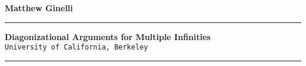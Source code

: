 \documentclass[a4paper,12pt]{article}
\newcommand{\titleline}[1]{\noindent\rule{\textwidth}{#1}}
\begin{document}
\vspace*{\fill}

\begin{center}

\textbf{Matthew  Ginelli}

\end{center}
\titleline{5pt}

\begin{center}
\bigskip
\textbf{Diagonizational Arguments for Multiple Infinities}\\
\smallskip
\texttt{University of California, Berkeley}
\medskip
\end{center}

\titleline{5pt}
\vspace*{\fill}
\end{document}
